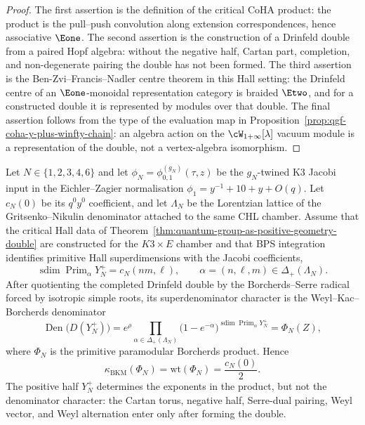 \begin{proof}
The first assertion is the definition of the critical CoHA product:
the product is the pull--push convolution along extension
correspondences, hence associative $\Eone$. The second assertion is
the construction of a Drinfeld double from a paired Hopf algebra:
without the negative half, Cartan part, completion, and non-degenerate
pairing the double has not been formed. The third assertion is the
Ben-Zvi--Francis--Nadler centre theorem in this Hall setting: the
Drinfeld centre of an $\Eone$-monoidal representation category is
braided $\Etwo$, and for a constructed double it is represented by
modules over that double. The final assertion follows from the type of
the evaluation map in
Proposition~\ref{prop:qgf-coha-y-plus-winfty-chain}: an algebra action
on the $\cW_{1+\infty}[\lambda]$ vacuum module is a representation of
the double, not a vertex-algebra isomorphism.
\end{proof}

\begin{theorem}
\label{thm:qgf-hall-double-borcherds-weight}
Let $N\in\{1,2,3,4,6\}$ and let
$\phi_N=\phi^{(g_N)}_{0,1}(\tau,z)$ be the $g_N$-twined K3 Jacobi input
in the Eichler--Zagier normalisation
$\phi_1=y^{-1}+10+y+O(q)$. Let $c_N(0)$ be its $q^0y^0$
coefficient, and let $\Lambda_N$ be the Lorentzian lattice of the
Gritsenko--Nikulin denominator attached to the same CHL chamber. Assume
that the critical Hall data of
Theorem~\ref{thm:quantum-group-as-positive-geometry-double} are
constructed for the $K3\times E$ chamber and that BPS integration
identifies primitive Hall superdimensions with the Jacobi coefficients,
\[
 \operatorname{sdim}
 \operatorname{Prim}_{\alpha}Y^+_N
 =
 c_N(nm,\ell),
 \qquad
 \alpha=(n,\ell,m)\in\Delta_+(\Lambda_N).
\]
After quotienting the completed Drinfeld double by the
Borcherds--Serre radical forced by isotropic simple roots, its
superdenominator character is the Weyl--Kac--Borcherds denominator
\[
 \operatorname{Den}\bigl(D(Y^+_N)\bigr)
 =
 e^\rho
 \prod_{\alpha\in\Delta_+(\Lambda_N)}
 \bigl(1-e^{-\alpha}\bigr)^{
 \operatorname{sdim}\operatorname{Prim}_{\alpha}Y^+_N}
 =
 \Phi_N(Z),
\]
where $\Phi_N$ is the primitive paramodular Borcherds product. Hence
\[
 \kappa_{\mathrm{BKM}}(\Phi_N)
 =
 \mathrm{wt}(\Phi_N)
 =
 \frac{c_N(0)}{2}.
\]
The positive half $Y^+_N$ determines the exponents in the product, but
not the denominator character: the Cartan torus, negative half,
Serre-dual pairing, Weyl vector, and Weyl alternation enter only after
forming the double.
\end{theorem}

